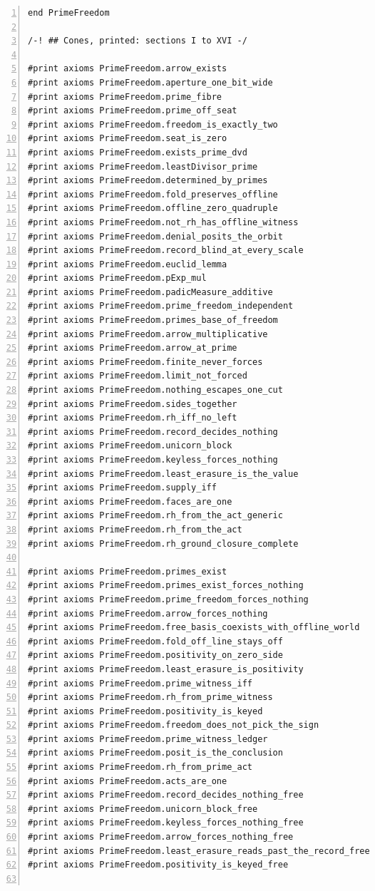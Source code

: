 \documentclass[10pt]{article}
\newcommand{\leansize}{\fontsize{5.5pt}{6.75pt}\selectfont}
\begin{document}
\begin{multicols}{2}
\begin{Verbatim}[numbers=left,firstnumber=1,numbersep=3pt,xleftmargin=2.6em,breaklines=true,breakanywhere=true,breakautoindent=false,breakindent=1.4em,breaksymbolleft={},breakanywheresymbolpre={},fontsize=\leansize]
end PrimeFreedom

/-! ## Cones, printed: sections I to XVI -/

#print axioms PrimeFreedom.arrow_exists
#print axioms PrimeFreedom.aperture_one_bit_wide
#print axioms PrimeFreedom.prime_fibre
#print axioms PrimeFreedom.prime_off_seat
#print axioms PrimeFreedom.freedom_is_exactly_two
#print axioms PrimeFreedom.seat_is_zero
#print axioms PrimeFreedom.exists_prime_dvd
#print axioms PrimeFreedom.leastDivisor_prime
#print axioms PrimeFreedom.determined_by_primes
#print axioms PrimeFreedom.fold_preserves_offline
#print axioms PrimeFreedom.offline_zero_quadruple
#print axioms PrimeFreedom.not_rh_has_offline_witness
#print axioms PrimeFreedom.denial_posits_the_orbit
#print axioms PrimeFreedom.record_blind_at_every_scale
#print axioms PrimeFreedom.euclid_lemma
#print axioms PrimeFreedom.pExp_mul
#print axioms PrimeFreedom.padicMeasure_additive
#print axioms PrimeFreedom.prime_freedom_independent
#print axioms PrimeFreedom.primes_base_of_freedom
#print axioms PrimeFreedom.arrow_multiplicative
#print axioms PrimeFreedom.arrow_at_prime
#print axioms PrimeFreedom.finite_never_forces
#print axioms PrimeFreedom.limit_not_forced
#print axioms PrimeFreedom.nothing_escapes_one_cut
#print axioms PrimeFreedom.sides_together
#print axioms PrimeFreedom.rh_iff_no_left
#print axioms PrimeFreedom.record_decides_nothing
#print axioms PrimeFreedom.unicorn_block
#print axioms PrimeFreedom.keyless_forces_nothing
#print axioms PrimeFreedom.least_erasure_is_the_value
#print axioms PrimeFreedom.supply_iff
#print axioms PrimeFreedom.faces_are_one
#print axioms PrimeFreedom.rh_from_the_act_generic
#print axioms PrimeFreedom.rh_from_the_act
#print axioms PrimeFreedom.rh_ground_closure_complete

#print axioms PrimeFreedom.primes_exist
#print axioms PrimeFreedom.primes_exist_forces_nothing
#print axioms PrimeFreedom.prime_freedom_forces_nothing
#print axioms PrimeFreedom.arrow_forces_nothing
#print axioms PrimeFreedom.free_basis_coexists_with_offline_world
#print axioms PrimeFreedom.fold_off_line_stays_off
#print axioms PrimeFreedom.positivity_on_zero_side
#print axioms PrimeFreedom.least_erasure_is_positivity
#print axioms PrimeFreedom.prime_witness_iff
#print axioms PrimeFreedom.rh_from_prime_witness
#print axioms PrimeFreedom.positivity_is_keyed
#print axioms PrimeFreedom.freedom_does_not_pick_the_sign
#print axioms PrimeFreedom.prime_witness_ledger
#print axioms PrimeFreedom.posit_is_the_conclusion
#print axioms PrimeFreedom.rh_from_prime_act
#print axioms PrimeFreedom.acts_are_one
#print axioms PrimeFreedom.record_decides_nothing_free
#print axioms PrimeFreedom.unicorn_block_free
#print axioms PrimeFreedom.keyless_forces_nothing_free
#print axioms PrimeFreedom.arrow_forces_nothing_free
#print axioms PrimeFreedom.least_erasure_reads_past_the_record_free
#print axioms PrimeFreedom.positivity_is_keyed_free


\end{Verbatim}
\end{multicols}
\end{document}
